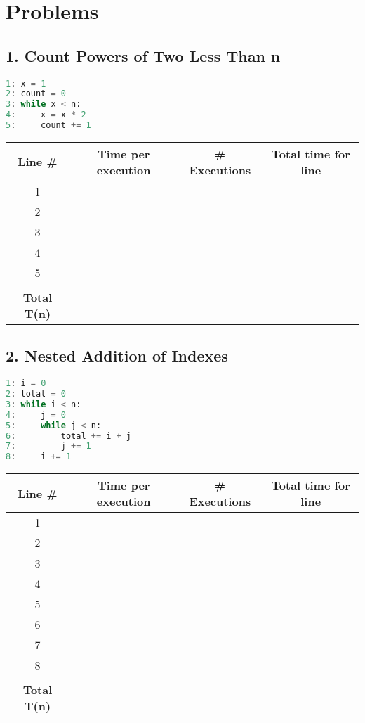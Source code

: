 \documentclass[12pt]{article}
\begin{document}
\section*{Problems}

\subsection*{1. Count Powers of Two Less Than n}
\begin{lstlisting}[language=Python]
1: x = 1
2: count = 0
3: while x < n:
4:     x = x * 2
5:     count += 1
\end{lstlisting}

\begin{tabular}{|c|c|c|c|}
\hline
Line \# & Time per execution & \# Executions & Total time for line \\
\hline
1 & & & \\
2 & & & \\
3 & & & \\
4 & & & \\
5 & & & \\
\hline
 & & & \\
\textbf{Total T(n)} & & & \\
\hline
\end{tabular}

\subsection*{2. Nested Addition of Indexes}
\begin{lstlisting}[language=Python]
1: i = 0
2: total = 0
3: while i < n:
4:     j = 0
5:     while j < n:
6:         total += i + j
7:         j += 1
8:     i += 1
\end{lstlisting}

\begin{tabular}{|c|c|c|c|}
\hline
Line \# & Time per execution & \# Executions & Total time for line \\
\hline
1 & & & \\
2 & & & \\
3 & & & \\
4 & & & \\
5 & & & \\
6 & & & \\
7 & & & \\
8 & & & \\
\hline
 & & & \\
\textbf{Total T(n)} & & & \\
\hline
\end{tabular}
\end{document}
